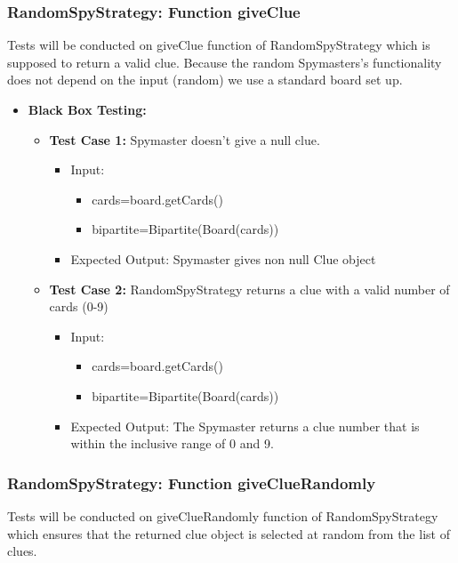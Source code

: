 \documentclass[12pt]{article}
\begin{document}
\subsubsection{RandomSpyStrategy: Function giveClue}
Tests will be conducted on giveClue function of RandomSpyStrategy which is supposed to return a valid clue. Because the random Spymasters's functionality does not depend on the input (random) we use a standard board set up.

\begin{itemize}
    \item \textbf{Black Box Testing:}
    \begin{itemize}
        \item \textbf{Test Case 1:} Spymaster doesn't give a null clue.
            \begin{itemize}
                \item Input:                 
                \begin{itemize}
                    \item cards=board.getCards()
                    \item bipartite=Bipartite(Board(cards))
                \end{itemize}
                \item Expected Output: Spymaster gives non null Clue object
            \end{itemize}
        \item \textbf{Test Case 2:} RandomSpyStrategy returns a clue with a valid number of cards (0-9)
        \begin{itemize}
            \item Input:                 
                \begin{itemize}
                    \item cards=board.getCards()
                    \item bipartite=Bipartite(Board(cards))
                \end{itemize}
            \item Expected Output: The Spymaster returns a clue number that is within the inclusive range of 0 and 9.
            \end{itemize}
    \end{itemize}
\end{itemize}

\subsubsection{RandomSpyStrategy: Function giveClueRandomly}
Tests will be conducted on giveClueRandomly function of RandomSpyStrategy which ensures that the returned clue object is selected at random from the list of clues.
\end{document}
